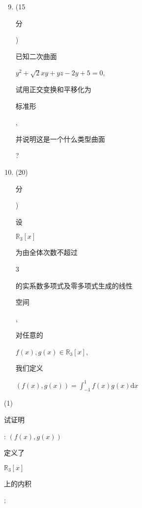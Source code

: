 \documentclass[10pt]{article}
\begin{document}
\begin{enumerate}
  \setcounter{enumi}{8}
  \item (15 \begin{CJK}{UTF8}{mj}分\end{CJK}) \begin{CJK}{UTF8}{mj}已知二次曲面\end{CJK} $y^{2}+\sqrt{2} x y+y z-2 y+5=0$, \begin{CJK}{UTF8}{mj}试用正交变换和平移化为\end{CJK} \begin{CJK}{UTF8}{mj}标准形\end{CJK}, \begin{CJK}{UTF8}{mj}并说明这是一个什么类型曲面\end{CJK}?

  \item (20)\begin{CJK}{UTF8}{mj}分\end{CJK}) \begin{CJK}{UTF8}{mj}设\end{CJK} $\mathbb{R}_{3}[x]$ \begin{CJK}{UTF8}{mj}为由全体次数不超过\end{CJK} 3 \begin{CJK}{UTF8}{mj}的实系数多项式及零多项式生成的线性\end{CJK} \begin{CJK}{UTF8}{mj}空间\end{CJK}, \begin{CJK}{UTF8}{mj}对任意的\end{CJK} $f(x), g(x) \in \mathbb{R}_{3}[x]$, \begin{CJK}{UTF8}{mj}我们定义\end{CJK} $(f(x), g(x))=\int_{-1}^{1} f(x) g(x) \mathrm{d} x$

\end{enumerate}
(1) \begin{CJK}{UTF8}{mj}试证明\end{CJK}: $(f(x), g(x))$ \begin{CJK}{UTF8}{mj}定义了\end{CJK} $\mathbb{R}_{3}[x]$ \begin{CJK}{UTF8}{mj}上的内积\end{CJK};
\end{document}
